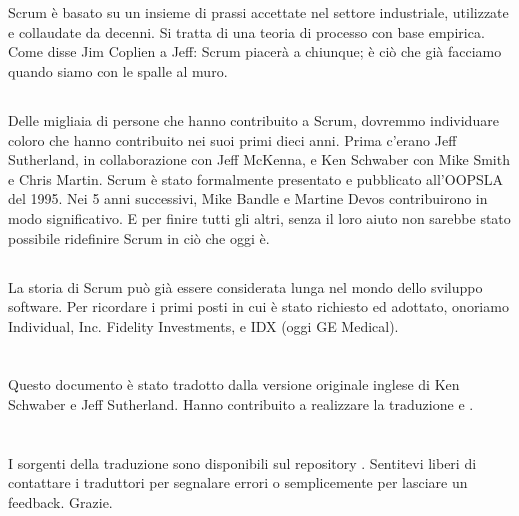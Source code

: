 \section*{\color{Blue}{RINGRAZIAMENTI}}
\label{sec:acknowledgements}

\subsection*{\color{Blue}{GENERALI}}
\label{sec:general}
Scrum \`e basato su un insieme di prassi accettate nel settore industriale, utilizzate e collaudate da decenni. Si
tratta di una teoria di processo con base empirica. Come disse Jim Coplien a Jeff: \flqq Scrum piacer\`a a chiunque; \`e
ci\`o che gi\`a facciamo quando siamo con le spalle al muro.\frqq

\subsection*{\color{Blue}{PERSONE}}
\label{sec:people}
Delle migliaia di persone che hanno contribuito a Scrum, dovremmo individuare coloro che hanno contribuito nei suoi
primi dieci anni. Prima c'erano Jeff Sutherland, in collaborazione con Jeff McKenna, e Ken Schwaber con Mike Smith e
Chris Martin. Scrum \`e stato formalmente presentato e pubblicato all'OOPSLA del 1995. Nei 5 anni successivi, Mike
Bandle e Martine Devos contribuirono in modo significativo. E per finire tutti gli altri, senza il loro aiuto non
sarebbe stato possibile ridefinire Scrum in ci\`o che oggi \`e.

\subsection*{\color{Blue}{STORIA}}
\label{sec:history}
La storia di Scrum pu\`o gi\`a essere considerata lunga nel mondo dello sviluppo software. Per ricordare i primi posti
in cui \`e stato richiesto ed adottato, onoriamo Individual, Inc. Fidelity Investments, e IDX (oggi GE Medical).

\section*{\color{Blue}{TRADUZIONE}}
\label{sec:translation}
Questo documento \`e stato tradotto dalla versione originale inglese di Ken Schwaber e Jeff Sutherland. Hanno contribuito a realizzare la traduzione  e .

\section*{\color{Blue}{NOTE ALLA VERSIONE ITALIANA}}
\label{sec:translationnotes}
I sorgenti della traduzione sono disponibili sul repository . 
Sentitevi liberi di contattare i traduttori per segnalare errori o semplicemente per lasciare un feedback. Grazie.